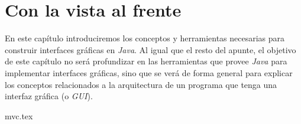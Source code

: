 \chapter{Con la vista al frente}
  En este capítulo introduciremos los conceptos y herramientas necesarias para construir interfaces
  gráficas en \textit{Java}.
  Al igual que el resto del apunte, el objetivo de este capítulo no será profundizar en las 
  herramientas que provee \textit{Java} para implementar interfaces gráficas, sino que se verá de 
  forma general para explicar los conceptos relacionados a la arquitectura de un programa que tenga
  una interfaz gráfica (o \textit{GUI}).

  {mvc.tex}

  \nocite{*}
  \printbibliography[keyword=gui]